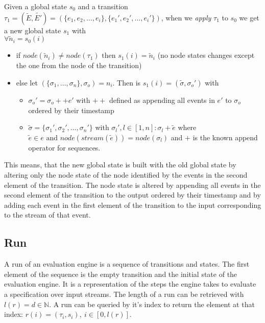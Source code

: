 \begin{definition}[name = Application of a Transition on a State]\label{sec:concepts:def:application_transition}
  Given a global state \(s_0\) and a transition \(\tau_1 = (\widetilde{E}, \widetilde{E'}) = (\{e_1,e_2,\dots,e_i\}, \{e_1',e_2',\dots,e_i'\})\), when we \emph{apply} \(\tau_1\) to \(s_0\) we get a new global state \(s_1\) with\\
  \(\forall \widetilde{n}_i = s_0(i)\)
  \begin{itemize}
    \item if \(\mathit{node}(\widetilde{n}_i) \neq \mathit{node}(\tau_1) \text{ then } s_1(i) = \widetilde{n}_i\) (no node states changes except the one from the node of the transition)
    \item else let \((\{\sigma_1,\dots,\sigma_n\}, \sigma_o) = n_i\). Then is \(s_1(i) = (\widetilde{\sigma}, \sigma_o')\) with
      \begin{itemize}
        \item \(\sigma_o' = \sigma_o ++ e'\) with \(++\) defined as appending all events in \(e'\) to \(\sigma_o\) ordered by their timestamp
        \item \(\widetilde{\sigma} = \{\sigma_1', \sigma_2', \dots, \sigma_n'\}\) with \(\sigma_l', l \in [1,n]: \sigma_l + \widetilde{e}\) where \(\widetilde{e} \in e \text{ and } \mathit{node}(\mathit{stream}(\widetilde{e})) = \mathit{node}(\sigma_l)\) and \(+\) is the known append operator for sequences.
      \end{itemize}
  \end{itemize}

\end{definition}

This means, that the new global state is built with the old global state by altering only the node state of the node identified by the events in the second element of the transition.
The node state is altered by appending all events in the second element of the transition to the output ordered by their timestamp and by adding each event in the first element of the transition to the input corresponding to the stream of that event.

\subsection{Run}
\label{sec:concepts:def:run}

A run of an evaluation engine is a sequence of transitions and states.
The first element of the sequence is the empty transition and the initial state of the evaluation engine.
It is a representation of the steps the engine takes to evaluate a specification over input streams.
The length of a run can be retrieved with \(l(r) = d \in \mathbb{N}\).
A run can be queried by it's index to return the element at that index: \(r(i)=(\tau_i, s_i),\ i \in [0, l(r)]\).

